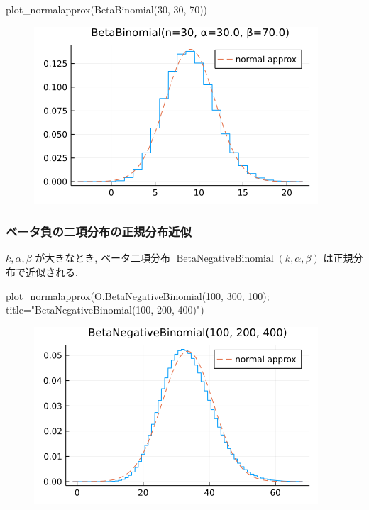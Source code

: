 \documentclass[
  letterpaper,
  DIV=11,
  numbers=noendperiod]{scrartcl}
\newenvironment{Shaded}{\begin{snugshade}}{\end{snugshade}}
\newcommand{\FloatTok}[1]{\textcolor[rgb]{0.68,0.00,0.00}{#1}}
\newcommand{\FunctionTok}[1]{\textcolor[rgb]{0.28,0.35,0.67}{#1}}
\newcommand{\NormalTok}[1]{\textcolor[rgb]{0.00,0.23,0.31}{#1}}
\newcommand{\OperatorTok}[1]{\textcolor[rgb]{0.37,0.37,0.37}{#1}}
\newcommand{\StringTok}[1]{\textcolor[rgb]{0.13,0.47,0.30}{#1}}
\begin{document}
\begin{Shaded}
\begin{Highlighting}[]
\FunctionTok{plot\_normalapprox}\NormalTok{(}\FunctionTok{BetaBinomial}\NormalTok{(}\FloatTok{30}\NormalTok{, }\FloatTok{30}\NormalTok{, }\FloatTok{70}\NormalTok{))}
\end{Highlighting}
\end{Shaded}

\begin{figure}[H]

{\centering \includegraphics{05 Central limit theorem_files/figure-pdf/cell-130-output-1.png}

}

\end{figure}

\hypertarget{ux30d9ux30fcux30bfux8ca0ux306eux4e8cux9805ux5206ux5e03ux306eux6b63ux898fux5206ux5e03ux8fd1ux4f3c}{%
\subsubsection{ベータ負の二項分布の正規分布近似}\label{ux30d9ux30fcux30bfux8ca0ux306eux4e8cux9805ux5206ux5e03ux306eux6b63ux898fux5206ux5e03ux8fd1ux4f3c}}

\(k, \alpha, \beta\) が大きなとき, ベータ二項分布
\(\operatorname{BetaNegativeBinomial}(k, \alpha, \beta)\)
は正規分布で近似される.

\begin{Shaded}
\begin{Highlighting}[]
\FunctionTok{plot\_normalapprox}\NormalTok{(O.}\FunctionTok{BetaNegativeBinomial}\NormalTok{(}\FloatTok{100}\NormalTok{, }\FloatTok{300}\NormalTok{, }\FloatTok{100}\NormalTok{);}
\NormalTok{    title}\OperatorTok{=}\StringTok{"BetaNegativeBinomial(100, 200, 400)"}\NormalTok{)}
\end{Highlighting}
\end{Shaded}

\begin{figure}[H]

{\centering \includegraphics{05 Central limit theorem_files/figure-pdf/cell-131-output-1.png}

}

\end{figure}
\end{document}
